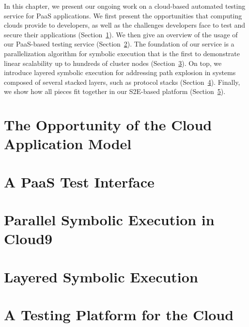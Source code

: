 In this chapter, we present our ongoing work on a cloud-based automated testing service for PaaS applications.
%
We first present the opportunities that computing clouds provide to developers, as well as the challenges developers face to test and secure their applications (Section~\ref{sec:paas:opportunity}).
%
We then give an overview of the usage of our PaaS-based testing service (Section~\ref{sec:paas:abstractions}).
%
The foundation of our service is a parallelization algorithm for symbolic execution that is the first to demonstrate linear scalability up to hundreds of cluster nodes (Section~\ref{sec:paas:parsymbex}).
%
On top, we introduce layered symbolic execution for addressing path explosion in systems composed of several stacked layers, such as protocol stacks (Section~\ref{sec:paas:layeredsymbex}).
%
Finally, we show how all pieces fit together in our S2E-based platform (Section~\ref{sec:paas:fedsymbex}).

\section{The Opportunity of the Cloud Application Model}
\label{sec:paas:opportunity}


\section{A PaaS Test Interface}
\label{sec:paas:abstractions}


\section{Parallel Symbolic Execution in Cloud9}
\label{sec:paas:parsymbex}


\section{Layered Symbolic Execution}
\label{sec:paas:layeredsymbex}


\section{A Testing Platform for the Cloud}
\label{sec:paas:fedsymbex}





